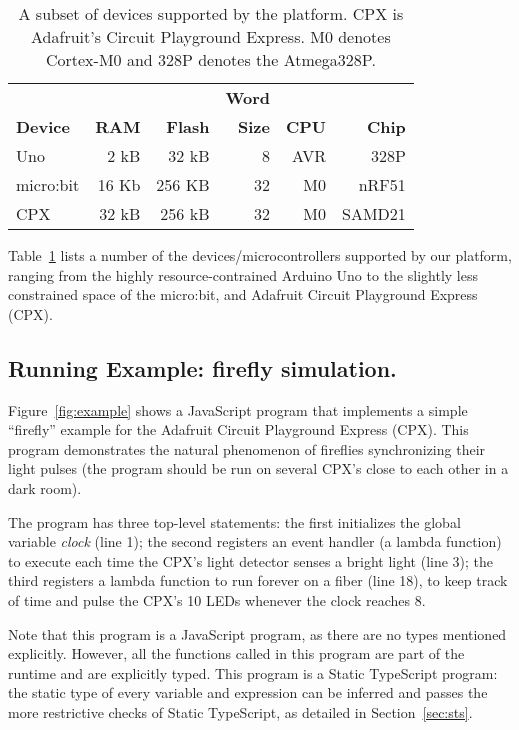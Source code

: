 \begin{table}[]
\centering
\begin{tabular}{|l|r|r|r|r|r|}
\hline
            &          &            & \bf{Word} &          &             \\
\bf{Device} & \bf{RAM} & \bf{Flash} & \bf{Size} & \bf{CPU} & \bf{Chip}   \\ \hline
Uno         & 2 kB     & 32 kB      & 8         & AVR      & 328P  \\ \hline
micro:bit   & 16 Kb    & 256 KB     & 32        & M0       & nRF51       \\ \hline
CPX         & 32 kB    & 256 kB     & 32        & M0       & SAMD21      \\ \hline
\end{tabular}
\caption{\label{table:devices}A subset of devices supported by the platform.
CPX is Adafruit's Circuit Playground Express. M0 denotes Cortex-M0 and 328P denotes
the Atmega328P.}
\end{table}

Table~\ref{table:devices} lists a number of the devices/microcontrollers supported by our platform,
ranging from the highly resource-contrained Arduino Uno to the slightly less constrained space of
the micro:bit, and Adafruit Circuit Playground Express (CPX).

\subsection{Running Example: firefly simulation.}

Figure~\ref{fig:example} shows a JavaScript
program that implements a simple ``firefly'' example
for the Adafruit Circuit Playground Express (CPX).
This program demonstrates the natural phenomenon
of fireflies synchronizing their light pulses (the program should be
run on several CPX's close to each other in a dark room).

The program has three top-level statements:
the first initializes the global variable \emph{clock} (line 1); the
second registers an event handler (a lambda function) to execute
each time the CPX's light detector senses a bright light (line 3); the
third registers a lambda function to run forever on a fiber (line 18),
to keep track of time and pulse the CPX's 10 LEDs whenever the
clock reaches 8.

Note that this program is a JavaScript program, as there are no
types mentioned explicitly. However, all the functions called in
this program are part of the runtime and are explicitly
typed. This program is a Static TypeScript program:
the static type of every variable and expression
can be inferred and passes the more restrictive checks
of Static TypeScript, as detailed in Section~\ref{sec:sts}.

